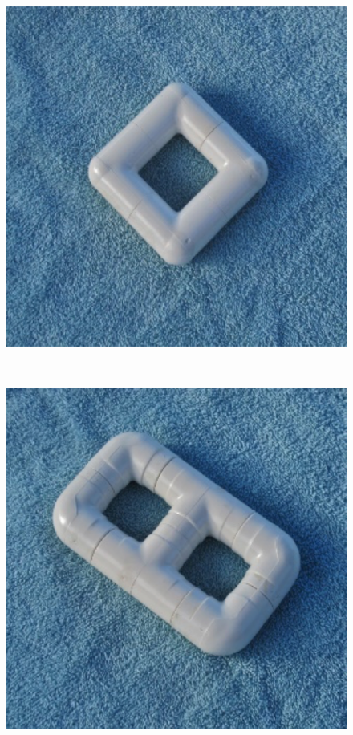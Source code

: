 \documentclass[letterpaper,11pt]{article}
\begin{document}
\begin{figure}[h!tbp]
\centering
\begin{minipage}[b]{0.2\textwidth} 
	\includegraphics[width=\textwidth]{figures/figure2a.png}
        	\subcaption{} %
        	\label{fig:2a}
\end{minipage}
~ %
\begin{minipage}[b]{0.2\textwidth} 
	\includegraphics[width=\textwidth]{figures/figure2b.png}

\end{minipage}
\end{figure}
\end{document}
